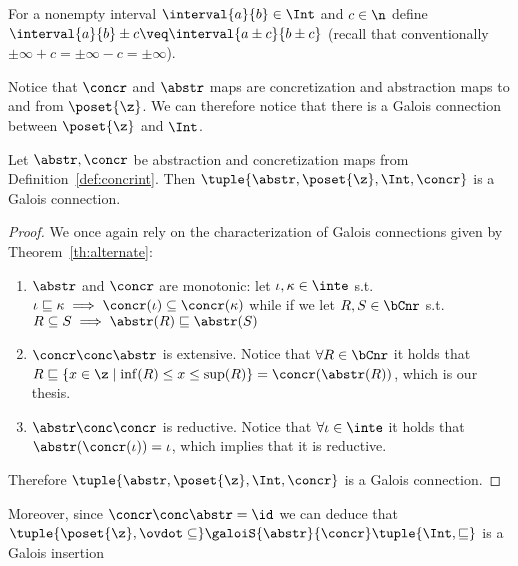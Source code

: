 \begin{definition}
  For a nonempty interval \(\interval{a}{b} \in \Int\) and
  \(c \in \n\) define
  \(\interval{a}{b} \pm c \veq \interval{a\pm c}{b\pm c}\) (recall
  that conventionally \(\pm \infty + c = \pm\infty - c = \pm\infty\)).
\end{definition}

Notice that \(\concr\) and \(\abstr\) maps are concretization and
abstraction maps to and from \(\poset{\z}\). We can therefore notice
that there is a Galois connection between \(\poset{\z}\) and \(\Int\).

\begin{lemma}\label{le:inteposetz}
  Let \(\abstr,\concr\) be abstraction and concretization maps from
  Definition~\ref{def:concrint}. Then
  \(\tuple{\abstr, \poset{\z}, \Int, \concr}\) is a Galois connection.
\end{lemma}

\begin{proof}
  We once again rely on the characterization of Galois connections
  given by Theorem~\ref{th:alternate}:
  \begin{enumerate}[label = (\roman*)]
  \item \(\abstr\) and \(\concr\) are monotonic: let
    \(\iota, \kappa\in\inte\) s.t.\
    \(\iota \sqsubseteq \kappa \implies \concr(\iota) \subseteq
    \concr(\kappa)\) while if we let \(R,S \in \bCnr\) s.t.\
    \(R\subseteq S \implies \abstr(R) \sqsubseteq \abstr(S)\)
  \item \(\concr \conc \abstr\) is extensive. Notice that
    \(\forall R \in \bCnr\) it holds that
    \(R \sqsubseteq \{x\in\z \mid \inf(R) \leq x \leq \sup(R)\} =
    \concr(\abstr(R))\), which is our thesis.
  \item \(\abstr\conc\concr\) is reductive. Notice that
    \(\forall \iota \in \inte\) it holds that
    \(\abstr(\concr(\iota)) = \iota\), which implies that it is
    reductive.
  \end{enumerate}
  Therefore \(\tuple{\abstr, \poset{\z}, \Int, \concr}\) is a Galois
  connection.
\end{proof}

Moreover, since \(\concr \conc \abstr = \id\) we can deduce that
\(\tuple{\poset{\z}, \ovdot\subseteq} \galoiS{\abstr}{\concr}
\tuple{\Int, \sqsubseteq}\) is a Galois insertion

